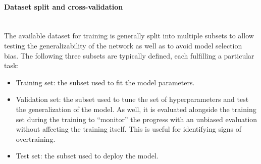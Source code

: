 \paragraph{Dataset split and cross-validation}\mbox{}\\
\label{subsec:par:kfold-crossval}
The available dataset for training is generally split into multiple subsets to allow testing the generalizability of the network as well as to avoid model selection bias.
The following three subsets are typically defined, each fulfilling a particular task:
\begin{itemize}
    \item Training set: the subset used to fit the model parameters.
    \item Validation set: the subset used to tune the set of hyperparameters and test the generalization of the model. As well, it is evaluated alongside the training set during the training to ``monitor'' the progress with an unbiased evaluation without affecting the training itself. This is useful for identifying signs of overtraining.
    \item Test set: the subset used to deploy the model. 
\end{itemize}

